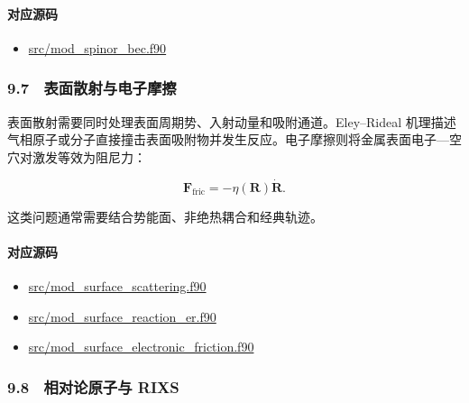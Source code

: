\documentclass[
]{ctexbook}
\providecommand{\tightlist}{%
  \setlength{\itemsep}{0pt}\setlength{\parskip}{0pt}}
\begin{document}
\hypertarget{ux5bf9ux5e94ux6e90ux7801-44}{%
\paragraph{对应源码}\label{ux5bf9ux5e94ux6e90ux7801-44}}

\begin{itemize}
\tightlist
\item
  \href{https://github.com/l1Ha/QuantumGeneralModule/blob/main/src/mod_spinor_bec.f90}{src/mod\_spinor\_bec.f90}
\end{itemize}

\hypertarget{ux8868ux9762ux6563ux5c04ux4e0eux7535ux5b50ux6469ux64e6}{%
\subsubsection{9.7　表面散射与电子摩擦}\label{ux8868ux9762ux6563ux5c04ux4e0eux7535ux5b50ux6469ux64e6}}

表面散射需要同时处理表面周期势、入射动量和吸附通道。Eley--Rideal
机理描述气相原子或分子直接撞击表面吸附物并发生反应。电子摩擦则将金属表面电子---空穴对激发等效为阻尼力：

\[
\mathbf F_{\mathrm{fric}}=-\eta(\mathbf R)\dot{\mathbf R}.
\]

这类问题通常需要结合势能面、非绝热耦合和经典轨迹。

\hypertarget{ux5bf9ux5e94ux6e90ux7801-45}{%
\paragraph{对应源码}\label{ux5bf9ux5e94ux6e90ux7801-45}}

\begin{itemize}
\tightlist
\item
  \href{https://github.com/l1Ha/QuantumGeneralModule/blob/main/src/mod_surface_scattering.f90}{src/mod\_surface\_scattering.f90}
\item
  \href{https://github.com/l1Ha/QuantumGeneralModule/blob/main/src/mod_surface_reaction_er.f90}{src/mod\_surface\_reaction\_er.f90}
\item
  \href{https://github.com/l1Ha/QuantumGeneralModule/blob/main/src/mod_surface_electronic_friction.f90}{src/mod\_surface\_electronic\_friction.f90}
\end{itemize}

\hypertarget{ux76f8ux5bf9ux8bbaux539fux5b50ux4e0e-rixs}{%
\subsubsection{9.8　相对论原子与
RIXS}\label{ux76f8ux5bf9ux8bbaux539fux5b50ux4e0e-rixs}}
\end{document}
